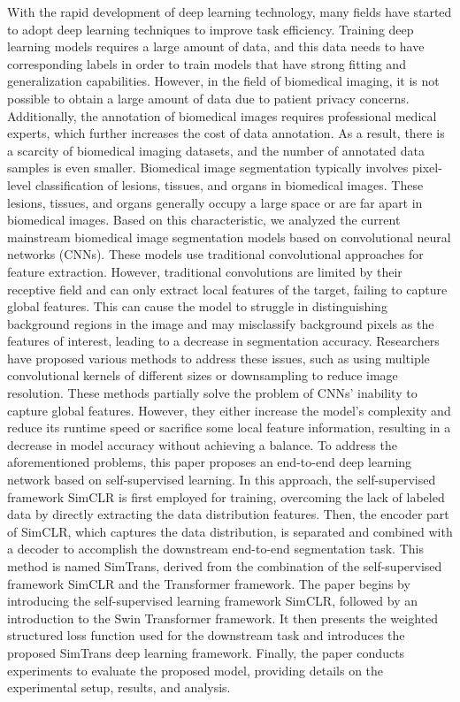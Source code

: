 \documentclass[10pt,twocolumn,letterpaper]{article}
\begin{document}
With the rapid development of deep learning technology, many fields have started to adopt deep learning techniques to improve task efficiency. Training deep learning models requires a large amount of data, and this data needs to have corresponding labels in order to train models that have strong fitting and generalization capabilities. However, in the field of biomedical imaging, it is not possible to obtain a large amount of data due to patient privacy concerns. Additionally, the annotation of biomedical images requires professional medical experts, which further increases the cost of data annotation. As a result, there is a scarcity of biomedical imaging datasets, and the number of annotated data samples is even smaller.
Biomedical image segmentation typically involves pixel-level classification of lesions, tissues, and organs in biomedical images. These lesions, tissues, and organs generally occupy a large space or are far apart in biomedical images. Based on this characteristic, we analyzed the current mainstream biomedical image segmentation models based on convolutional neural networks (CNNs). These models use traditional convolutional approaches for feature extraction. However, traditional convolutions are limited by their receptive field and can only extract local features of the target, failing to capture global features. This can cause the model to struggle in distinguishing background regions in the image and may misclassify background pixels as the features of interest, leading to a decrease in segmentation accuracy. Researchers have proposed various methods to address these issues, such as using multiple convolutional kernels of different sizes or downsampling to reduce image resolution. These methods partially solve the problem of CNNs' inability to capture global features. However, they either increase the model's complexity and reduce its runtime speed or sacrifice some local feature information, resulting in a decrease in model accuracy without achieving a balance.
To address the aforementioned problems, this paper proposes an end-to-end deep learning network based on self-supervised learning. In this approach, the self-supervised framework SimCLR is first employed for training, overcoming the lack of labeled data by directly extracting the data distribution features. Then, the encoder part of SimCLR, which captures the data distribution, is separated and combined with a decoder to accomplish the downstream end-to-end segmentation task. This method is named SimTrans, derived from the combination of the self-supervised framework SimCLR and the Transformer framework.
The paper begins by introducing the self-supervised learning framework SimCLR, followed by an introduction to the Swin Transformer framework. It then presents the weighted structured loss function used for the downstream task and introduces the proposed SimTrans deep learning framework. Finally, the paper conducts experiments to evaluate the proposed model, providing details on the experimental setup, results, and analysis.
\end{document}
